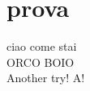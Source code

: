\documentclass{article}
\begin{document}
    \section{prova}
        ciao come stai\\
        ORCO BOIO\\
        Another try! A!
\end{document}
